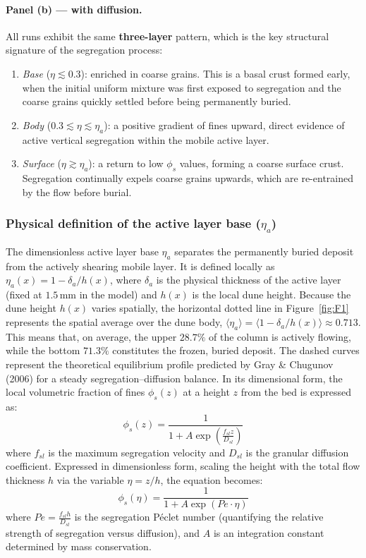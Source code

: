 \documentclass[12pt, a4paper]{article}
\begin{document}
\paragraph{Panel (b) --- with diffusion.}
All runs exhibit the same \textbf{three-layer} pattern, which is the
key structural signature of the segregation process:
\begin{enumerate}
    \item \textit{Base} ($\eta \lesssim 0.3$): enriched in coarse grains.
          This is a basal crust formed early, when the initial uniform mixture
          was first exposed to segregation and the coarse grains quickly settled
          before being permanently buried.
    \item \textit{Body} ($0.3 \lesssim \eta \lesssim \eta_a$): a positive
          gradient of fines upward, direct evidence of active vertical segregation
          within the mobile active layer.
    \item \textit{Surface} ($\eta \gtrsim \eta_a$): a return to low $\phi_s$
          values, forming a coarse surface crust. Segregation continually expels
          coarse grains upwards, which are re-entrained by the flow before burial.
\end{enumerate}

\subsubsection*{Physical definition of the active layer base ($\eta_a$)}
The dimensionless active layer base $\eta_a$ separates the permanently buried deposit from the actively shearing mobile layer. It is defined locally as $\eta_a(x) = 1 - \delta_a / h(x)$, where $\delta_a$ is the physical thickness of the active layer (fixed at $1.5$\,mm in the model) and $h(x)$ is the local dune height. Because the dune height $h(x)$ varies spatially, the horizontal dotted line in Figure~\ref{fig:F1} represents the spatial average over the dune body, $\langle\eta_a\rangle = \langle 1 - \delta_a / h(x) \rangle \approx 0.713$. This means that, on average, the upper $28.7\%$ of the column is actively flowing, while the bottom $71.3\%$ constitutes the frozen, buried deposit.
The dashed curves represent the theoretical equilibrium profile predicted by Gray \& Chugunov (2006) for a steady segregation--diffusion balance. In its dimensional form, the local volumetric fraction of fines $\phi_s(z)$ at a height $z$ from the bed is expressed as:
\begin{equation}
    \phi_s(z) = \frac{1}{1 + A \exp\left(\frac{f_{sl} z}{D_{sl}}\right)}
\end{equation}
where $f_{sl}$ is the maximum segregation velocity and $D_{sl}$ is the granular diffusion coefficient. Expressed in dimensionless form, scaling the height with the total flow thickness $h$ via the variable $\eta = z/h$, the equation becomes:
\begin{equation}
    \phi_s(\eta) = \frac{1}{1 + A \exp(Pe \cdot \eta)}
\end{equation}
where $Pe = \frac{f_{sl} h}{D_{sl}}$ is the segregation Péclet number (quantifying the relative strength of segregation versus diffusion), and $A$ is an integration constant determined by mass conservation. 
\end{document}
